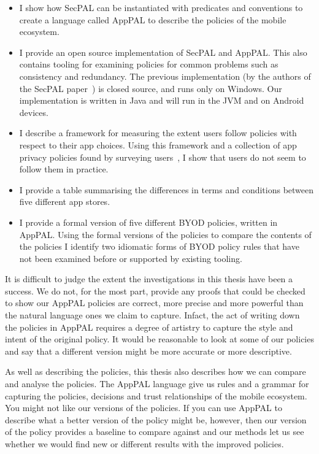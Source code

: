 \documentclass[thesis.tex]{subfiles}
\begin{document}
\begin{itemize}
  \item I show how SecPAL can be instantiated with predicates and conventions
    to create a language called AppPAL to describe the policies of the mobile
    ecosystem.
  \item I provide an open source implementation of SecPAL and AppPAL. This also
    contains tooling for examining policies for common problems such as
    consistency and redundancy.  The previous implementation (by the authors of
    the SecPAL paper~\cite{becker_secpal:_2006}) is closed source, and runs
    only on Windows.  Our implementation is written in Java and will run in the
    JVM and on Android devices.
  \item I describe a framework for measuring the extent users follow policies
    with respect to their app choices.  Using this framework and a collection
    of app privacy policies found by surveying users~\cite{lin_modeling_2014},
    I show that users do not seem to follow them in practice.
  \item I provide a table summarising the differences in terms and conditions
    between five different app stores.
  \item I provide a formal version of five different \ac{BYOD} policies, written in
    AppPAL.  Using the formal versions of the policies to compare the contents
    of the policies I identify two idiomatic forms of \ac{BYOD} policy rules that
    have not been examined before or supported by existing tooling.
\end{itemize}

It is difficult to judge the extent the investigations in this thesis have been
a success.  We do not, for the most part, provide any proofs that could be
checked to show our AppPAL policies are correct, more precise and more powerful
than the natural language ones we claim to capture.  Infact, the act of writing
down the policies in AppPAL requires a degree of artistry to capture the style
and intent of the original policy. It would be reasonable to look at some of
our policies and say that a different version might be more accurate or more
descriptive.

As well as describing the policies, this thesis also describes how we can
compare and analyse the policies. The AppPAL language give us rules and a
grammar for capturing the policies, decisions and trust relationships of the
mobile ecosystem.  You might not like our versions of the policies. If you can
use AppPAL to describe what a better version of the policy might be, however,
then our version of the policy provides a baseline to compare against and our
methods let us see whether we would find new or different results with the
improved policies.
\end{document}
